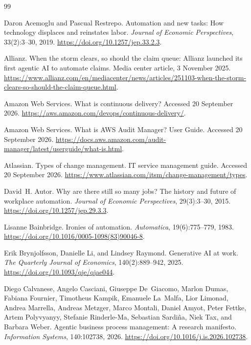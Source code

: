 \begingroup
\small
\raggedright
\setlength{\bibsep}{3pt}
\begin{thebibliography}{99}

Daron Acemoglu and Pascual Restrepo.
\newblock Automation and new tasks: How technology displaces and reinstates labor.
\newblock \emph{Journal of Economic Perspectives}, 33(2):3--30, 2019.
\newblock \url{https://doi.org/10.1257/jep.33.2.3}.

Allianz.
\newblock When the storm clears, so should the claim queue: Allianz launched its first agentic AI to automate claims.
\newblock Media center article, 3 November 2025.
\newblock \url{https://www.allianz.com/en/mediacenter/news/articles/251103-when-the-storm-clears-so-should-the-claim-queue.html}.

Amazon Web Services.
\newblock What is continuous delivery?
\newblock Accessed 20 September 2026.
\newblock \url{https://aws.amazon.com/devops/continuous-delivery/}.

Amazon Web Services.
\newblock What is AWS Audit Manager? User Guide.
\newblock Accessed 20 September 2026.
\newblock \url{https://docs.aws.amazon.com/audit-manager/latest/userguide/what-is.html}.

Atlassian.
\newblock Types of change management. IT service management guide.
\newblock Accessed 20 September 2026.
\newblock \url{https://www.atlassian.com/itsm/change-management/types}.

David~H. Autor.
\newblock Why are there still so many jobs? The history and future of workplace automation.
\newblock \emph{Journal of Economic Perspectives}, 29(3):3--30, 2015.
\newblock \url{https://doi.org/10.1257/jep.29.3.3}.

Lisanne Bainbridge.
\newblock Ironies of automation.
\newblock \emph{Automatica}, 19(6):775--779, 1983.
\newblock \url{https://doi.org/10.1016/0005-1098(83)90046-8}.

Erik Brynjolfsson, Danielle Li, and Lindsey Raymond.
\newblock Generative AI at work.
\newblock \emph{The Quarterly Journal of Economics}, 140(2):889--942, 2025.
\newblock \url{https://doi.org/10.1093/qje/qjae044}.

Diego Calvanese, Angelo Casciani, Giuseppe De~Giacomo, Marlon Dumas, Fabiana Fournier, Timotheus
Kampik, Emanuele La~Malfa, Lior Limonad, Andrea Marrella, Andreas Metzger, Marco Montali, Daniel
Amyot, Peter Fettke, Artem Polyvyanyy, Stefanie Rinderle-Ma, Sebastian Sardi\~na, Niek Tax, and
Barbara Weber.
\newblock Agentic business process management: A research manifesto.
\newblock \emph{Information Systems}, 140:102738, 2026.
\newblock \url{https://doi.org/10.1016/j.is.2026.102738}.


\end{thebibliography}
